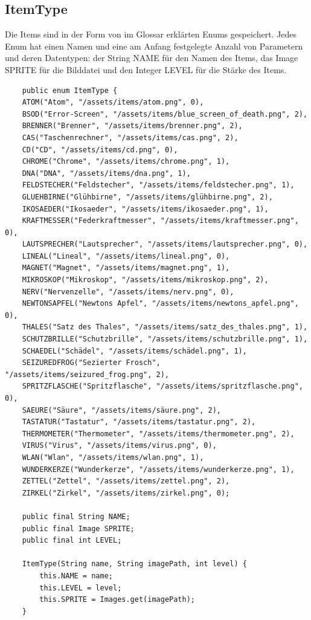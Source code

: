 \subsection{ItemType}
Die Items sind in der Form von im Glossar erklärten Enums gespeichert. Jedes Enum hat einen Namen und eine am Anfang festgelegte Anzahl von Parametern und deren Datentypen: der String NAME für den Namen des Items, das Image SPRITE für die Bilddatei und den Integer LEVEL für die Stärke des Items. 

\begin{lstlisting}
    public enum ItemType {
    ATOM("Atom", "/assets/items/atom.png", 0),
    BSOD("Error-Screen", "/assets/items/blue_screen_of_death.png", 2),
    BRENNER("Brenner", "/assets/items/brenner.png", 2),
    CAS("Taschenrechner", "/assets/items/cas.png", 2),
    CD("CD", "/assets/items/cd.png", 0),
    CHROME("Chrome", "/assets/items/chrome.png", 1),
    DNA("DNA", "/assets/items/dna.png", 1),
    FELDSTECHER("Feldstecher", "/assets/items/feldstecher.png", 1),
    GLUEHBIRNE("Glühbirne", "/assets/items/glühbirne.png", 2),
    IKOSAEDER("Ikosaeder", "/assets/items/ikosaeder.png", 1),
    KRAFTMESSER("Federkraftmesser", "/assets/items/kraftmesser.png", 0),
    LAUTSPRECHER("Lautsprecher", "/assets/items/lautsprecher.png", 0),
    LINEAL("Lineal", "/assets/items/lineal.png", 0),
    MAGNET("Magnet", "/assets/items/magnet.png", 1),
    MIKROSKOP("Mikroskop", "/assets/items/mikroskop.png", 2),
    NERV("Nervenzelle", "/assets/items/nerv.png", 0),
    NEWTONSAPFEL("Newtons Apfel", "/assets/items/newtons_apfel.png", 0),
    THALES("Satz des Thales", "/assets/items/satz_des_thales.png", 1),
    SCHUTZBRILLE("Schutzbrille", "/assets/items/schutzbrille.png", 1),
    SCHAEDEL("Schädel", "/assets/items/schädel.png", 1),
    SEIZUREDFROG("Sezierter Frosch", "/assets/items/seizured_frog.png", 2),
    SPRITZFLASCHE("Spritzflasche", "/assets/items/spritzflasche.png", 0),
    SAEURE("Säure", "/assets/items/säure.png", 2),
    TASTATUR("Tastatur", "/assets/items/tastatur.png", 2),
    THERMOMETER("Thermometer", "/assets/items/thermometer.png", 2),
    VIRUS("Virus", "/assets/items/virus.png", 0),
    WLAN("Wlan", "/assets/items/wlan.png", 1),
    WUNDERKERZE("Wunderkerze", "/assets/items/wunderkerze.png", 1),
    ZETTEL("Zettel", "/assets/items/zettel.png", 2),
    ZIRKEL("Zirkel", "/assets/items/zirkel.png", 0);
        
    public final String NAME;
    public final Image SPRITE;
    public final int LEVEL;
    
    ItemType(String name, String imagePath, int level) {
        this.NAME = name;
        this.LEVEL = level;
        this.SPRITE = Images.get(imagePath);
    }
\end{lstlisting}

